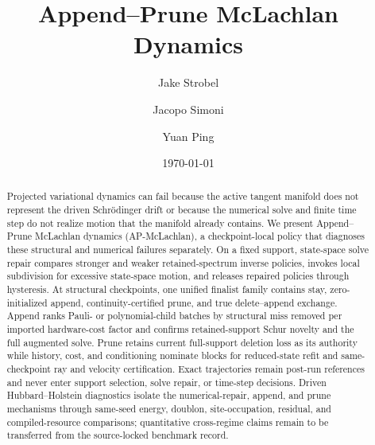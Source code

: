 \documentclass[
  reprint,
  amsmath,
  amssymb,
  aps,
  pra,
  nofootinbib,
  superscriptaddress,
  floatfix
]{revtex4-2}
\newcommand{\tentative}[1]{\textcolor{red!70!black}{#1}}
\begin{document}
\title{Append--Prune McLachlan Dynamics}

\author{Jake Strobel}
\author{Jacopo Simoni}
\author{Yuan Ping}

\date{\today}


\begin{abstract}
Projected variational dynamics can fail because the active tangent manifold does not represent the driven Schr\"odinger drift or because the numerical solve and finite time step do not realize motion that the manifold already contains.  We present Append--Prune McLachlan dynamics (AP-McLachlan), a checkpoint-local policy that diagnoses these structural and numerical failures separately.  On a fixed support, state-space solve repair compares stronger and weaker retained-spectrum inverse policies, invokes local subdivision for excessive state-space motion, and releases repaired policies through hysteresis.  At structural checkpoints, one unified finalist family contains stay, zero-initialized append, continuity-certified prune, and true delete--append exchange.  Append ranks Pauli- or polynomial-child batches by structural miss removed per imported hardware-cost factor and confirms retained-support Schur novelty and the full augmented solve.  Prune retains current full-support deletion loss as its authority while history, cost, and conditioning nominate blocks for reduced-state refit and same-checkpoint ray and velocity certification.  Exact trajectories remain post-run references and never enter support selection, solve repair, or time-step decisions.  Driven Hubbard--Holstein diagnostics isolate the numerical-repair, append, and prune mechanisms through same-seed energy, doublon, site-occupation, residual, and compiled-resource comparisons; quantitative cross-regime claims remain \tentative{to be transferred from the source-locked benchmark record}.
\end{abstract}

\maketitle
\end{document}
